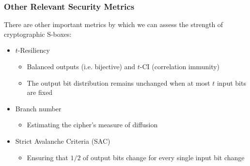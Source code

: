 \documentclass[handout,10pt]{beamer}
\begin{document}





\begin{frame}
	\frametitle{Other Relevant Security Metrics}
	There are other important metrics by which we can assess the strength of cryptographic S-boxes:
	\begin{itemize}
		\item $t$-Resiliency
		\begin{itemize}
			\item Balanced outputs (i.e. bijective) and $t$-CI (correlation immunity)
			\item The output bit distribution remains unchanged when at most $t$ input bits are fixed
		\end{itemize}
		\item Branch number
		\begin{itemize}
			\item Estimating the cipher's measure of diffusion
		\end{itemize}
		\item Strict Avalanche Criteria (SAC) 
		\begin{itemize}
			\item Ensuring that $1/2$ of output bits change for every single input bit change
		\end{itemize}
	\end{itemize}
\end{frame}
\end{document}
